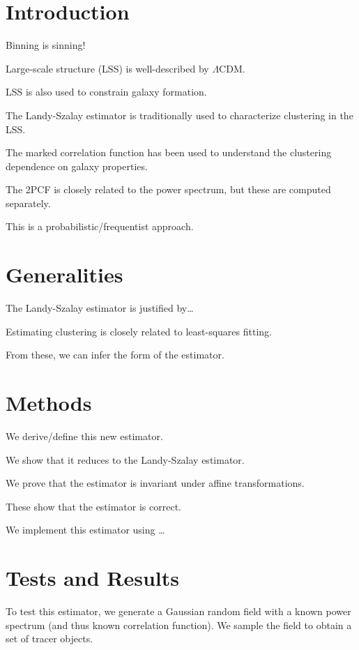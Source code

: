 \documentclass[modern]{aastex62}
\begin{document}
\section{Introduction}

Binning is sinning!

Large-scale structure (LSS) is well-described by $\Lambda$CDM. 

LSS is also used to constrain galaxy formation.

The Landy-Szalay estimator is traditionally used to characterize clustering in the LSS.

The marked correlation function has been used to understand the clustering dependence on galaxy properties.

The 2PCF is closely related to the power spectrum, but these are computed separately. 

This is a probabilistic/frequentist approach.

\section{Generalities}

The Landy-Szalay estimator is justified by\ldots

Estimating clustering is closely related to least-squares fitting.

From these, we can infer the form of the estimator.

\section{Methods}

We derive/define this new estimator.

We show that it reduces to the Landy-Szalay estimator.

We prove that the estimator is invariant under affine transformations.

These show that the estimator is correct.

We implement this estimator using \ldots

\section{Tests and Results}

To test this estimator, we generate a Gaussian random field with a known power spectrum (and thus known correlation function). We sample the field to obtain a set of tracer objects.
\end{document}
